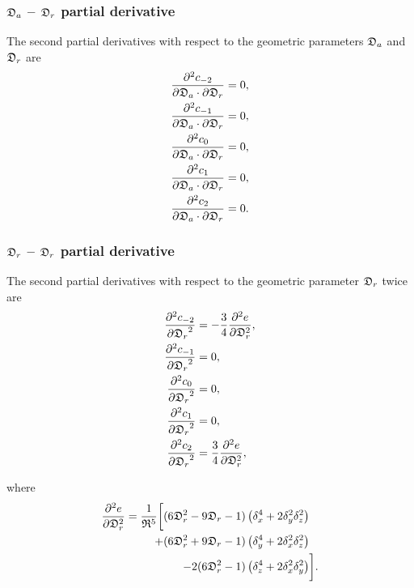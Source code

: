 \subsubsection{$\mathfrak{D}_a$ -- $\mathfrak{D}_r$ partial derivative}

The second partial derivatives with respect to the geometric parameters $\mathfrak{D}_a$ and $\mathfrak{D}_r$ are
\begin{subequations}
\begin{align}
    \frac{\partial^2 c_{-2}}{\partial \mathfrak{D}_a \cdot \partial \mathfrak{D}_r}  &=  0, \\
    \frac{\partial^2 c_{-1}}{\partial \mathfrak{D}_a \cdot \partial \mathfrak{D}_r} &= 0, \\
    \frac{\partial^2 c_{0}}{\partial \mathfrak{D}_a \cdot \partial \mathfrak{D}_r}  &= 0, \\
    \frac{\partial^2 c_{1}}{\partial \mathfrak{D}_a \cdot \partial \mathfrak{D}_r}  &= 0, \\
    \frac{\partial^2 c_{2}}{\partial \mathfrak{D}_a \cdot \partial \mathfrak{D}_r}  &= 0.
\end{align}
\end{subequations}



\subsubsection{$\mathfrak{D}_r$ -- $\mathfrak{D}_r$ partial derivative}

The second partial derivatives with respect to the geometric parameter $\mathfrak{D}_r$ twice are
\begin{subequations}
\begin{align}
    \frac{\partial^2 c_{-2}}{{\partial \mathfrak{D}_r}^2}  &=  - \frac{3}{4} \frac{\partial^2 e}{\partial \mathfrak{D}_r^2}, \\
    \frac{\partial^2 c_{-1}}{{\partial \mathfrak{D}_r}^2} &= 0, \\
    \frac{\partial^2 c_{0}}{{\partial \mathfrak{D}_r}^2}  &= 0, \\
    \frac{\partial^2 c_{1}}{{\partial \mathfrak{D}_r}^2}  &= 0, \\
    \frac{\partial^2 c_{2}}{{\partial \mathfrak{D}_r}^2}  &= \frac{3}{4} \frac{\partial^2 e}{\partial \mathfrak{D}_r^2},
\end{align}
\end{subequations}

\noindent where
\begin{align}
    \frac{\partial^2 e}{\partial \mathfrak{D}_r^2}  =  \frac{1}{\mathfrak{R}^5} \bigg[
        (6\mathfrak{D}_r^2 - 9\mathfrak{D}_r - 1) \left(\delta_x^4 + 2\delta_y^2\delta_z^2\right) & \nonumber \\
        + (6\mathfrak{D}_r^2 + 9\mathfrak{D}_r - 1) \left(\delta_y^4 + 2\delta_x^2\delta_z^2\right) & \nonumber \\
        - 2 (6\mathfrak{D}_r^2 - 1) \left(\delta_z^4 + 2\delta_x^2\delta_y^2\right) & \bigg].
\end{align}



